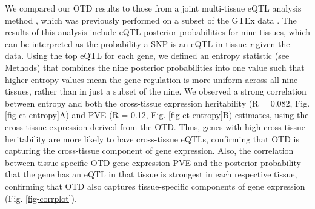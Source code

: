 \documentclass[10pt,letterpaper]{article}
\begin{document}

We compared our OTD results to those from a joint multi-tissue eQTL analysis method \cite{Flutre_2013}, which was previously performed on a subset of the GTEx data \cite{Ardlie_2015}. The results of this analysis include eQTL posterior probabilities for nine tissues, which can be interpreted as the probability a SNP is an eQTL in tissue \emph{x} given the data. Using the top eQTL for each gene, we defined an entropy statistic (see Methods) that combines the nine posterior probabilities into one value such that higher entropy values mean the gene regulation is more uniform across all nine tissues, rather than in just a subset of the nine. We observed a strong correlation between entropy and both the cross-tissue expression heritability (R = 0.082, Fig. \ref{fig-ct-entropy}A) and PVE (R = 0.12, Fig. \ref{fig-ct-entropy}B) estimates, using the cross-tissue expression derived from the OTD. Thus, genes with high cross-tissue heritability are more likely to have cross-tissue eQTLs, confirming that OTD is capturing the cross-tissue component of gene expression. Also, the correlation between tissue-specific OTD gene expression PVE and the posterior probability that the gene has an eQTL in that tissue is strongest in each respective tissue, confirming that OTD also captures tissue-specific components of gene expression (Fig. \ref{fig-corrplot}).
\end{document}
